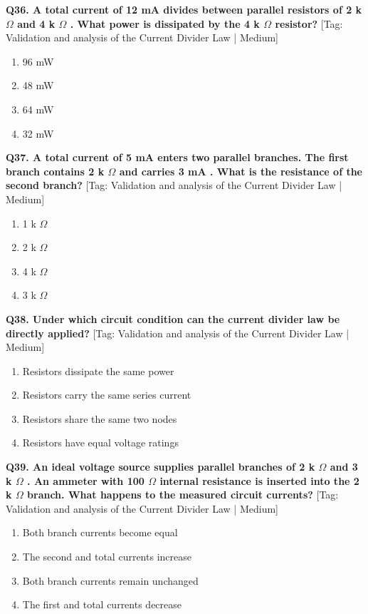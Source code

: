 \noindent\textbf{Q36. A total current of 12 mA divides between parallel resistors of 2 k $\Omega$ and 4 k $\Omega$ . What power is dissipated by the 4 k $\Omega$ resistor?} \hfill [Tag: Validation and analysis of the Current Divider Law | Medium]
\begin{enumerate}[label=(\alph*),topsep=2pt,itemsep=1pt,partopsep=0pt,parsep=0pt]
    \item {96 mW}
    \item {48 mW}
    \item {64 mW}
    \item {32 mW}
\end{enumerate}
\vspace{2mm}

\noindent\textbf{Q37. A total current of 5 mA enters two parallel branches. The first branch contains 2 k $\Omega$ and carries 3 mA . What is the resistance of the second branch?} \hfill [Tag: Validation and analysis of the Current Divider Law | Medium]
\begin{enumerate}[label=(\alph*),topsep=2pt,itemsep=1pt,partopsep=0pt,parsep=0pt]
    \item {1 k $\Omega$}
    \item {2 k $\Omega$}
    \item {4 k $\Omega$}
    \item {3 k $\Omega$}
\end{enumerate}
\vspace{2mm}

\noindent\textbf{Q38. Under which circuit condition can the current divider law be directly applied?} \hfill [Tag: Validation and analysis of the Current Divider Law | Medium]
\begin{enumerate}[label=(\alph*),topsep=2pt,itemsep=1pt,partopsep=0pt,parsep=0pt]
    \item {Resistors dissipate the same power}
    \item {Resistors carry the same series current}
    \item {Resistors share the same two nodes}
    \item {Resistors have equal voltage ratings}
\end{enumerate}
\vspace{2mm}

\noindent\textbf{Q39. An ideal voltage source supplies parallel branches of 2 k $\Omega$ and 3 k $\Omega$ . An ammeter with 100 $\Omega$ internal resistance is inserted into the 2 k $\Omega$ branch. What happens to the measured circuit currents?} \hfill [Tag: Validation and analysis of the Current Divider Law | Medium]
\begin{enumerate}[label=(\alph*),topsep=2pt,itemsep=1pt,partopsep=0pt,parsep=0pt]
    \item {Both branch currents become equal}
    \item {The second and total currents increase}
    \item {Both branch currents remain unchanged}
    \item {The first and total currents decrease}
\end{enumerate}
\vspace{2mm}

